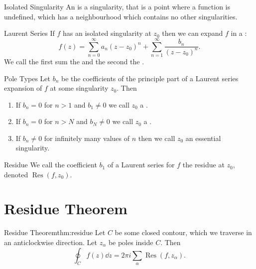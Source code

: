 \documentclass[fleqn]{NotesClass}
\DeclareMathOperator{\Res}{Res}
\begin{document}
    \begin{dfn}{Isolated Singularity}{}
        An  is a singularity, that is a point where a function is undefined, which has a neighbourhood which contains no other singularities.
    \end{dfn}
    
    \begin{thm}{Laurent Series}{}
        If \(f\) has an isolated singularity at \(z_0\) then we can expand \(f\) in a :
        \begin{equation}
            f(z) = \sum_{n=0}^{\infty} a_n(z - z_0)^n + \sum_{n=1}^{\infty} \frac{b_n}{(z - z_0)^n}.
        \end{equation}
        We call the first sum the  and the second the .
    \end{thm}
    
    \begin{dfn}{Pole Types}{}
        Let \(b_n\) be the coefficients of the principle part of a Laurent series expansion of \(f\) at some singularity \(z_0\).
        Then
        \begin{enumerate}
            \item If \(b_n = 0\) for \(n > 1\) and \(b_1 \ne 0\) we call \(z_0\) a .
            \item If \(b_n = 0\) for \(n > N\) and \(b_N \ne 0\) we call \(z_0\) a .
            \item If \(b_n \ne 0\) for infinitely many values of \(n\) then we call \(z_0\) an essential singularity.
        \end{enumerate}
    \end{dfn}
    
    \begin{dfn}{Residue}{}
        We call the coefficient \(b_1\) of a Laurent series for \(f\) the residue at \(z_0\), denoted \(\Res(f, z_0)\).
    \end{dfn}
    
    \section{Residue Theorem}
    \begin{thm}{Residue Theorem}{thm:residue}
        Let \(C\) be some closed contour, which we traverse in an anticlockwise direction.
        Let \(z_\alpha\) be poles inside \(C\).
        Then
        \begin{equation}
            \oint_C f(z) \dd{z} = 2\pi i\sum_\alpha \Res(f, z_\alpha).
        \end{equation}
    \end{thm}
    
\end{document}
